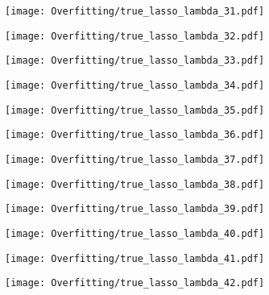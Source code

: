 \documentclass[xcolor=pdftex,dvipsnames,table]{beamer}
\begin{document}
\frame
{
	\begin{center}
		\texttt{[image: Overfitting/true\_lasso\_lambda\_31.pdf]}
	\end{center}
}

\frame
{
	\begin{center}
		\texttt{[image: Overfitting/true\_lasso\_lambda\_32.pdf]}
	\end{center}
}

\frame
{
	\begin{center}
		\texttt{[image: Overfitting/true\_lasso\_lambda\_33.pdf]}
	\end{center}
}

\frame
{
	\begin{center}
		\texttt{[image: Overfitting/true\_lasso\_lambda\_34.pdf]}
	\end{center}
}

\frame
{
	\begin{center}
		\texttt{[image: Overfitting/true\_lasso\_lambda\_35.pdf]}
	\end{center}
}

\frame
{
	\begin{center}
		\texttt{[image: Overfitting/true\_lasso\_lambda\_36.pdf]}
	\end{center}
}

\frame
{
	\begin{center}
		\texttt{[image: Overfitting/true\_lasso\_lambda\_37.pdf]}
	\end{center}
}

\frame
{
	\begin{center}
		\texttt{[image: Overfitting/true\_lasso\_lambda\_38.pdf]}
	\end{center}
}

\frame
{
	\begin{center}
		\texttt{[image: Overfitting/true\_lasso\_lambda\_39.pdf]}
	\end{center}
}

\frame
{
	\begin{center}
		\texttt{[image: Overfitting/true\_lasso\_lambda\_40.pdf]}
	\end{center}
}

\frame
{
	\begin{center}
		\texttt{[image: Overfitting/true\_lasso\_lambda\_41.pdf]}
	\end{center}
}

\frame
{
	\begin{center}
		\texttt{[image: Overfitting/true\_lasso\_lambda\_42.pdf]}
	\end{center}
}
\end{document}
